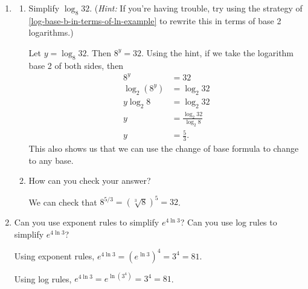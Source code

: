 \documentclass{article}
\providecommand{\check}{}
\renewcommand{\check}{\ifmmode{\text{ \ding{51} }}\else{\ding{51} }\fi}
\begin{document}
\begin{enumerate}[resume, topsep=0pt]
\item 
  \begin{enumerate}
  \item
    \begin{problem}[\vfill]
      Simplify $\log_8 32$. (\emph{Hint:} If you're having trouble, try using the strategy of \ref{log-base-b-in-terms-of-ln-example} to rewrite this in terms of base 2 logarithms.)
    \end{problem}

    \begin{solution}
      Let $y=\log_8 32$. Then $8^y = 32$. Using the hint,
      if we take the logarithm base 2 of both sides, then
      \begin{align*}
          8^y &= 32\\
          \log_2 (8^y) &= \log_2 32 \\
          y \log_2 8 &= \log_2 32 \\
          y &= \frac{\log_2 32}{\log_2 8} \\
          y &= \boxed{\frac{5}{3}}.
      \end{align*}
      This also shows us that we can use the change of base formula
      to change to any base.
    \end{solution}
    

  \item
    \begin{problem}[0.5in]
      \check How can you check your answer?
    \end{problem}

    \begin{solution}
      We can check that $8^{5/3} = (\sqrt[3]{8})^5 = 32$.
    \end{solution}
  \end{enumerate}

\item 
  \begin{problem}[\stretch{0.5}]
    Can you use exponent rules to simplify $e^{4 \ln 3}$? Can you use log rules to simplify $e^{4 \ln 3}$? 
  \end{problem}

  \begin{solution}
    Using exponent rules, $e^{4\ln3} = (e^{\ln3})^4 = 3^4=81$.

    Using log rules, $e^{4\ln3} = e^{\ln(3^4)} = 3^4 = 81$. 
  \end{solution}

\end{enumerate}
\end{document}
